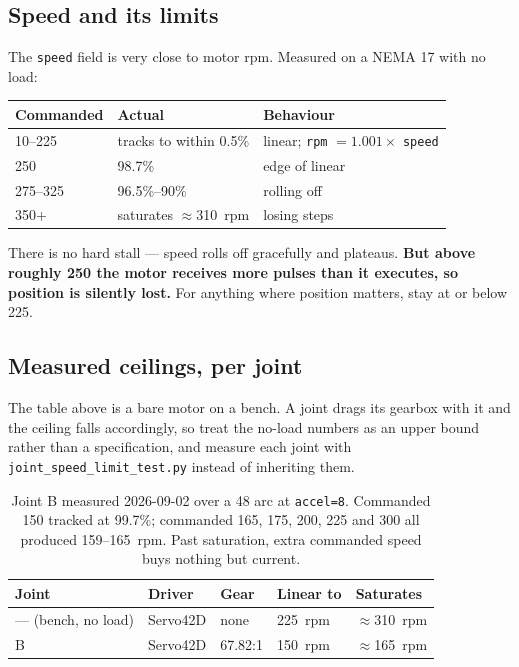 \documentclass[11pt,letterpaper]{article}
\begin{document}
\subsection{Speed and its limits}
The \texttt{speed} field is very close to motor rpm. Measured on a NEMA 17 with no
load:

\begin{table}[h]
\centering
\begin{tabular}{lll}
\toprule
\textbf{Commanded} & \textbf{Actual} & \textbf{Behaviour} \\ \midrule
10--225  & tracks to within 0.5\% & linear; \texttt{rpm} $= 1.001 \times$ \texttt{speed} \\
250      & 98.7\%                 & edge of linear \\
275--325 & 96.5\%--90\%           & rolling off \\
350+     & saturates $\approx$310~rpm & losing steps \\
\bottomrule
\end{tabular}
\end{table}

There is no hard stall --- speed rolls off gracefully and plateaus. \textbf{But
above roughly 250 the motor receives more pulses than it executes, so position is
silently lost.} For anything where position matters, stay at or below 225.

\subsection{Measured ceilings, per joint}
The table above is a bare motor on a bench. A joint drags its gearbox with it and
the ceiling falls accordingly, so treat the no-load numbers as an upper bound
rather than a specification, and measure each joint with
\texttt{joint\_speed\_limit\_test.py} instead of inheriting them.

\begin{table}[h]
\centering
\begin{tabular}{lllll}
\toprule
\textbf{Joint} & \textbf{Driver} & \textbf{Gear} & \textbf{Linear to} & \textbf{Saturates} \\ \midrule
--- (bench, no load) & Servo42D & none      & 225~rpm & $\approx$310~rpm \\
B                    & Servo42D & 67.82:1   & 150~rpm & $\approx$165~rpm \\
\bottomrule
\end{tabular}
\caption{Joint B measured 2026-09-02 over a 48\textdegree{} arc at \texttt{accel=8}.
Commanded 150 tracked at 99.7\%; commanded 165, 175, 200, 225 and 300 all produced
159--165~rpm. Past saturation, extra commanded speed buys nothing but current.}
\end{table}
\end{document}
